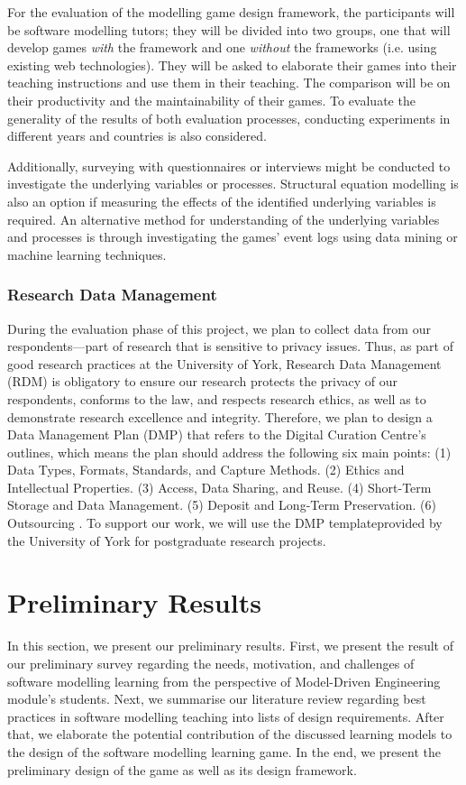 \documentclass[12pt, a4paper]{report}
\begin{document}
{For the evaluation of the modelling game design framework, the participants will be software modelling tutors; they will be divided into two groups, one that will develop games \emph{with} the framework and one \emph{without} the frameworks (i.e. using existing web technologies). They will be asked to elaborate their games into their teaching instructions and use them in their teaching. The comparison will be on their productivity and the maintainability of their games. To evaluate the generality of the results of both evaluation processes, conducting experiments in different years and countries is also considered.

Additionally, surveying with questionnaires or interviews might be conducted to investigate the underlying variables or processes. Structural equation modelling \cite{hair2016primer} is also an option if measuring the effects of the identified underlying variables is required. An alternative method for understanding of the underlying variables and processes is through investigating the games' event logs using data mining or machine learning techniques.

\subsection{Research Data Management}
During the evaluation phase of this project, we plan to collect data from our respondents---part of research that is sensitive to privacy issues. Thus, as  part of good research practices at the University of York\footnotemark {}, Research Data Management (RDM) is obligatory to ensure our research protects the privacy of our respondents, conforms to the law, and respects research ethics, as well as to demonstrate research excellence and integrity. Therefore, we plan to design a Data Management Plan (DMP) that refers to the Digital Curation Centre's outlines, which means the plan should address the following six main points: (1) Data Types, Formats, Standards, and Capture Methods. (2) Ethics and Intellectual Properties. (3) Access, Data Sharing, and Reuse. (4) Short-Term Storage and Data Management. (5) Deposit and Long-Term Preservation. (6) Outsourcing \cite{jones2011develop}. To support our work, we will use the DMP template\footnotemark[\value{footnote}] provided by the University of York for postgraduate research projects.
  
\chapter{Preliminary Results}
In this section, we present our preliminary results. First, we present the result of our preliminary survey regarding the needs, motivation, and challenges of software modelling learning from the perspective of Model-Driven Engineering module's students. Next, we summarise our literature review regarding best practices in software modelling teaching into lists of design requirements. After that, we elaborate the potential contribution of the discussed learning models to the design of the software modelling learning game. In the end, we present the preliminary design of the game as well as  its design framework. 

}
\end{document}
